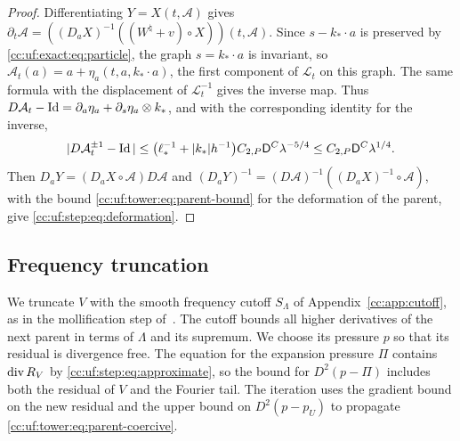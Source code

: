 \begin{proof}
Differentiating $Y=X(t,\mathcal A)$ gives
$\partial_t\mathcal A=((D_aX)^{-1}((W^\natural+v)\circ X))(t,\mathcal A)$.
Since $s-k_*\cdot a$ is preserved by \eqref{cc:uf:exact:eq:particle},
the graph $s=k_*\cdot a$ is invariant, so
$\mathcal A_t(a)=a+\eta_a(t,a,k_*\cdot a)$, the first
component of \(\mathscr L_t\) on this graph. The same formula with the
displacement of \(\mathscr L_t^{-1}\) gives the inverse map.
Thus $D\mathcal A_t-\operatorname{Id}=\partial_a\eta_a+\partial_s\eta_a\otimes k_*$,
and with the corresponding identity for the inverse,
\[
 |D\mathcal A_t^{\pm1}-\operatorname{Id}|
 \le\bigl(\ell_*^{-1}+|k_*|h^{-1}\bigr)C_{2,P}\mathsf D^C\lambda^{-5/4}
 \le C_{2,P}\mathsf D^C\lambda^{1/4}.
\]
Then \(D_aY=(D_aX\circ\mathcal A)D\mathcal A\) and
\((D_aY)^{-1}=(D\mathcal A)^{-1}((D_aX)^{-1}\circ\mathcal A)\), with
the bound \eqref{cc:uf:tower:eq:parent-bound} for the deformation of
the parent, give \eqref{cc:uf:step:eq:deformation}.
\end{proof}

\subsection{Frequency truncation}\label{cc:uf:trunc:sec:truncation}
We truncate $V$ with the smooth frequency cutoff $S_\Lambda$ of
Appendix~\ref{cc:app:cutoff}, as in the mollification step
of~\cite[Section~2.4]{BDLSVOnsager}. The cutoff bounds all higher
derivatives of the next parent in terms of $\Lambda$ and its supremum.
We choose its pressure $p$ so that its residual is divergence free.
The equation for the expansion pressure $\Pi$ contains $\operatorname{div} R_V$
by \eqref{cc:uf:step:eq:approximate}, so the bound for $D^2(p-\Pi)$
includes both the residual of $V$ and the Fourier tail. The iteration
uses the gradient bound on the new residual and the upper bound on
$D^2(p-p_U)$ to propagate \eqref{cc:uf:tower:eq:parent-coercive}.

